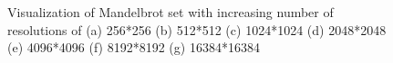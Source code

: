 \documentclass{report}
\begin{document}
\begin{figure}[H]
\begin{center}
\caption{Visualization of Mandelbrot set with increasing number of resolutions of (a) 256*256 (b) 512*512 (c) 1024*1024 (d) 2048*2048 (e) 4096*4096 (f) 8192*8192 (g) 16384*16384}
\label{fig:res_evo}
\end{center}
\end{figure}
\end{document}
